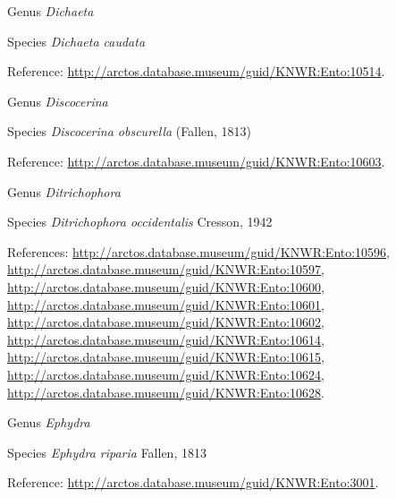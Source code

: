 \documentclass[9pt, article]{memoir}
\begin{document}
\begin{multicols}{2}
\vspace{6pt}\noindent\hspace{30pt}Genus \textit{Dichaeta}


\vspace{6pt}\noindent\hspace{36pt}Species \textit{Dichaeta caudata}


\vspace{6pt}Reference: 
\url{http://arctos.database.museum/guid/KNWR:Ento:10514}.

\vspace{6pt}\noindent\hspace{30pt}Genus \textit{Discocerina}


\vspace{6pt}\noindent\hspace{36pt}Species \textit{Discocerina obscurella} (Fallen, 1813)


\vspace{6pt}Reference: 
\url{http://arctos.database.museum/guid/KNWR:Ento:10603}.

\vspace{6pt}\noindent\hspace{30pt}Genus \textit{Ditrichophora}


\vspace{6pt}\noindent\hspace{36pt}Species \textit{Ditrichophora occidentalis} Cresson, 1942


\vspace{6pt}References: 
\url{http://arctos.database.museum/guid/KNWR:Ento:10596}, 
\url{http://arctos.database.museum/guid/KNWR:Ento:10597}, 
\url{http://arctos.database.museum/guid/KNWR:Ento:10600}, 
\url{http://arctos.database.museum/guid/KNWR:Ento:10601}, 
\url{http://arctos.database.museum/guid/KNWR:Ento:10602}, 
\url{http://arctos.database.museum/guid/KNWR:Ento:10614}, 
\url{http://arctos.database.museum/guid/KNWR:Ento:10615}, 
\url{http://arctos.database.museum/guid/KNWR:Ento:10624}, 
\url{http://arctos.database.museum/guid/KNWR:Ento:10628}.

\vspace{6pt}\noindent\hspace{30pt}Genus \textit{Ephydra}


\vspace{6pt}\noindent\hspace{36pt}Species \textit{Ephydra riparia} Fallen, 1813


\vspace{6pt}Reference: 
\url{http://arctos.database.museum/guid/KNWR:Ento:3001}.


\end{multicols}
\end{document}
